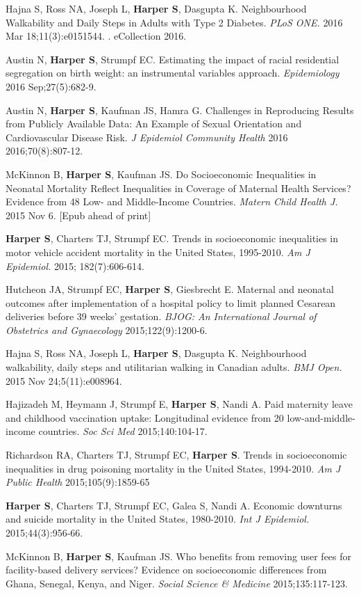 \documentclass[
  letterpaper,
  DIV=11,
  numbers=noendperiod]{scrartcl}
\begin{document}
Hajna S, Ross NA, Joseph L, \textbf{Harper S}, Dasgupta K. Neighbourhood
Walkability and Daily Steps in Adults with Type 2 Diabetes. \emph{PLoS
ONE.} 2016 Mar 18;11(3):e0151544. . eCollection 2016.

Austin N, \textbf{Harper S}, Strumpf EC. Estimating the impact of racial
residential segregation on birth weight: an instrumental variables
approach. \emph{Epidemiology} 2016 Sep;27(5):682-9.

Austin N, \textbf{Harper S}, Kaufman JS, Hamra G. Challenges in
Reproducing Results from Publicly Available Data: An Example of Sexual
Orientation and Cardiovascular Disease Risk. \emph{J Epidemiol Community
Health} 2016 2016;70(8):807-12.

McKinnon B, \textbf{Harper S}, Kaufman JS. Do Socioeconomic Inequalities
in Neonatal Mortality Reflect Inequalities in Coverage of Maternal
Health Services? Evidence from 48 Low- and Middle-Income Countries.
\emph{Matern Child Health J.} 2015 Nov 6. {[}Epub ahead of print{]}

\textbf{Harper S}, Charters TJ, Strumpf EC. Trends in socioeconomic
inequalities in motor vehicle accident mortality in the United States,
1995-2010. \emph{Am J Epidemiol.} 2015; 182(7):606-614.

Hutcheon JA, Strumpf EC, \textbf{Harper S}, Giesbrecht E. Maternal and
neonatal outcomes after implementation of a hospital policy to limit
planned Cesarean deliveries before 39 weeks' gestation. \emph{BJOG: An
International Journal of Obstetrics and Gynaecology} 2015;122(9):1200-6.

Hajna S, Ross NA, Joseph L, \textbf{Harper S}, Dasgupta K. Neighbourhood
walkability, daily steps and utilitarian walking in Canadian adults.
\emph{BMJ Open.} 2015 Nov 24;5(11):e008964.

Hajizadeh M, Heymann J, Strumpf E, \textbf{Harper S}, Nandi A. Paid
maternity leave and childhood vaccination uptake: Longitudinal evidence
from 20 low-and-middle-income countries. \emph{Soc Sci Med}
2015;140:104-17.

Richardson RA, Charters TJ, Strumpf EC, \textbf{Harper S}. Trends in
socioeconomic inequalities in drug poisoning mortality in the United
States, 1994-2010. \emph{Am J Public Health} 2015;105(9):1859-65

\textbf{Harper S}, Charters TJ, Strumpf EC, Galea S, Nandi A. Economic
downturns and suicide mortality in the United States, 1980-2010.
\emph{Int J Epidemiol.} 2015;44(3):956-66.

McKinnon B, \textbf{Harper S}, Kaufman JS. Who benefits from removing
user fees for facility-based delivery services? Evidence on
socioeconomic differences from Ghana, Senegal, Kenya, and Niger.
\emph{Social Science \& Medicine} 2015;135:117-123.
\end{document}
